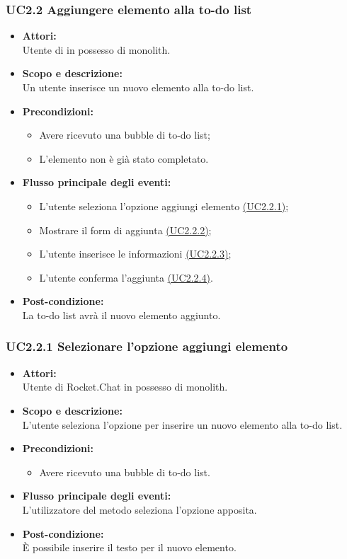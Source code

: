 \subsubsection{UC2.2 Aggiungere elemento alla to-do list} \label{UC2.2}

\begin{itemize}
	\item \textbf{Attori:}
	\\Utente di  in possesso di monolith.
	\item \textbf{Scopo e descrizione:} 
	\\Un utente inserisce un nuovo elemento alla to-do list.
	\item \textbf{Precondizioni:}
	\begin{itemize}
		\item Avere ricevuto una bubble di to-do list;
		\item L’elemento non è già stato completato.
	\end{itemize}
	\item \textbf{Flusso principale degli eventi:}
	\begin{itemize}
		\item L’utente seleziona l’opzione aggiungi elemento \hyperref[UC2.2.1]{(UC2.2.1)};
		\item Mostrare il form di aggiunta \hyperref[UC2.2.2]{(UC2.2.2)};
		\item L’utente inserisce le informazioni \hyperref[UC2.2.3]{(UC2.2.3)};
		\item L’utente conferma l’aggiunta \hyperref[UC2.2.4]{(UC2.2.4)}.
	\end{itemize}
	\item \textbf{Post-condizione:}
	\\La to-do list avrà il nuovo elemento aggiunto.
\end{itemize}

\subsubsection{UC2.2.1 Selezionare l’opzione aggiungi elemento} \label{UC2.2.1}

\begin{itemize}
	\item \textbf{Attori:}
	\\Utente di Rocket.Chat in possesso di monolith.
	\item \textbf{Scopo e descrizione:} 
	\\L’utente seleziona l’opzione per inserire un nuovo elemento alla to-do list.
	\item \textbf{Precondizioni:}
	\begin{itemize}
		\item Avere ricevuto una bubble di to-do list.
	\end{itemize}
	\item \textbf{Flusso principale degli eventi:}
	\\L’utilizzatore del metodo seleziona l’opzione apposita.
	\item \textbf{Post-condizione:}
	\\È possibile inserire il testo per il nuovo elemento. 
\end{itemize}

